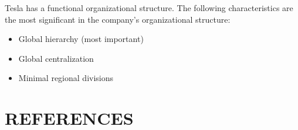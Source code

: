 \documentclass[12pt]{article}
\providecommand\phantomsection{} %
\begin{document}
Tesla has a functional organizational structure. The following characteristics are the most significant in the company's organizational structure:
\begin{itemize}
	\item{Global hierarchy (most important)}
	\item{Global centralization}
	\item{Minimal regional divisions}
\end{itemize}



\newpage

\begingroup 
\linespread{1}

\setlength\bibitemsep{\baselineskip}

\setlength{\bibhang}{0pt}

\section*{REFERENCES}
\phantomsection
{}%

\printbibliography[heading=none]
\endgroup
\end{document}
